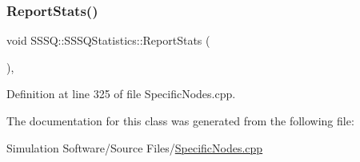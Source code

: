 \mbox{\label{class_s_s_s_q_1_1_s_s_s_q_statistics_ab53eda9d3355dec31021cbdba9333c85}} 
\subsubsection{\texorpdfstring{Report\+Stats()}{ReportStats()}}
{\footnotesize\ttfamily void S\+S\+S\+Q\+::\+S\+S\+S\+Q\+Statistics\+::\+Report\+Stats (\begin{DoxyParamCaption}{ }\end{DoxyParamCaption})\hspace{0.3cm}{\ttfamily [inline]}, {\ttfamily [override]}}



Definition at line 325 of file Specific\+Nodes.\+cpp.



The documentation for this class was generated from the following file\+:\begin{DoxyCompactItemize}
\item 
Simulation Software/\+Source Files/\hyperlink{_specific_nodes_8cpp}{Specific\+Nodes.\+cpp}\end{DoxyCompactItemize}
